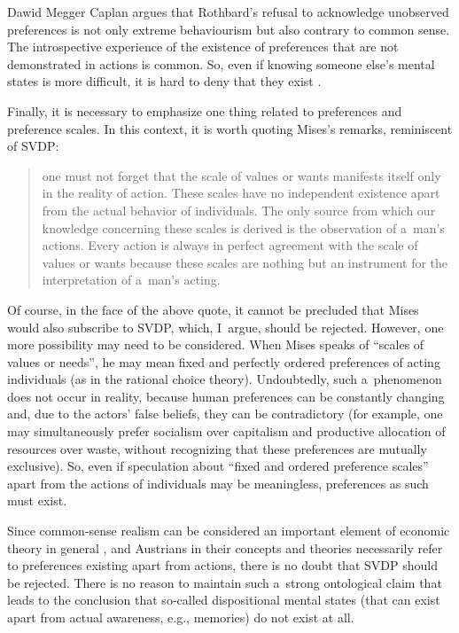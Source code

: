 \begin{artengenv}{Dawid Megger}
Caplan argues that Rothbard's refusal to acknowledge unobserved preferences is not only extreme behaviourism but also contrary to common sense. The introspective experience of the existence of preferences that are not demonstrated in actions is common. So, even if knowing someone else's mental states is more difficult, it is hard to deny that they exist 
\parencite[][p.834]{caplan_austrian_1999}.%




Finally, it is necessary to emphasize one thing related to preferences and preference scales. In this context, it is worth quoting Mises's remarks, reminiscent of SVDP:



\begin{quote}
one must not forget that the scale of values or wants manifests itself only in the reality of action. These scales have no independent existence apart from the actual behavior of individuals. The only source from which our knowledge concerning these scales is derived is the observation of a~man's actions. Every action is always in perfect agreement with the scale of values or wants because these scales are nothing but an instrument for the interpretation of a~man's acting. 
\parencite[][p.95]{mises_human_1998}%
\end{quote}




Of course, in the face of the above quote, it cannot be precluded that Mises would also subscribe to SVDP, which, I~argue, should be rejected. However, one more possibility may need to be considered. When Mises speaks of ``scales of values or needs'', he may mean fixed and perfectly ordered preferences of acting individuals (as in the rational choice theory). Undoubtedly, such a~phenomenon does not occur in reality, because human preferences can be constantly changing and, due to the actors' false beliefs, they can be contradictory (for example, one may simultaneously prefer socialism over capitalism and productive allocation of resources over waste, without recognizing that these preferences are mutually exclusive). So, even if speculation about ``fixed and ordered preference scales'' apart from the actions of individuals may be meaningless, preferences as such must exist.



Since common-sense realism can be considered an important element of economic theory in general 
\parencite[][]{hausman_realism_2008}, %
 and Austrians in their concepts and theories necessarily refer to preferences existing apart from actions, there is no doubt that SVDP should be rejected. There is no reason to maintain such a~strong ontological claim that leads to the conclusion that so-called dispositional mental states (that can exist apart from actual awareness, e.g., memories) do not exist at all.




\end{artengenv}
